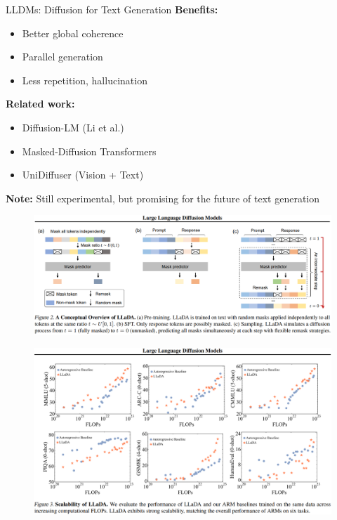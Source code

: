 \begin{frame}[allowframebreaks]{LLDMs: Diffusion for Text Generation}
    \vspace{0.5em}
    \textbf{Benefits:}
    \begin{itemize}
        \item Better global coherence
        \item Parallel generation
        \item Less repetition, hallucination
    \end{itemize}
\framebreak
    \textbf{Related work:}
    \begin{itemize}
        \item Diffusion-LM (Li et al.)
        \item Masked-Diffusion Transformers
        \item UniDiffuser (Vision + Text)
    \end{itemize}
    \vspace{0.5em}
    \textbf{Note:} Still experimental, but promising for the future of text generation
\framebreak
    \begin{figure}
        \centering
        \includegraphics[height=0.9\textheight,width=1.05\textwidth,keepaspectratio]{images/recent-advance/lldm-overview.png}
    \end{figure}
\framebreak
    \begin{figure}
        \centering
        \includegraphics[height=0.9\textheight,width=1.05\textwidth,keepaspectratio]{images/recent-advance/lldm-scalability.png}
    \end{figure}


\end{frame}
